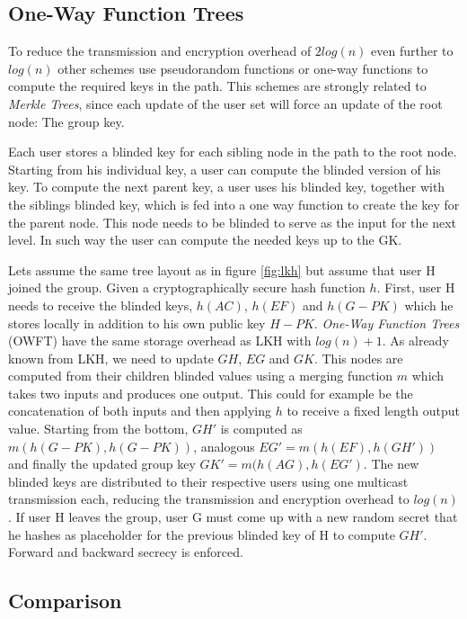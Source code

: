 \subsection{One-Way Function Trees}
To reduce the transmission and encryption overhead of $2log(n)$ even further to $log(n)$ other schemes use pseudorandom functions \cite{canetti1999multicast} or one-way functions \cite{sherman2003key} to compute the required keys in the path. This schemes are strongly related to \textit{Merkle Trees}, since each update of the user set will force an update of the root node: The group key.

Each user stores a blinded key for each sibling node in the path to the root node. Starting from his individual key, a user can compute the blinded version of his key. To compute the next parent key, a user uses his blinded key, together with the siblings blinded key, which is fed into a one way function to create the key for the parent node. This node needs to be blinded to serve as the input for the next level. In such way the user can compute the needed keys up to the GK. 

Lets assume the same tree layout as in figure \ref{fig:lkh} but assume that user H joined the group. Given a cryptographically secure hash function $h$. First, user H needs to receive the blinded keys, $h(AC)$, $h(EF)$ and $h(G-PK)$ which he stores locally in addition to his own public key $H-PK$. \textit{One-Way Function Trees} (\ac{OWFT}) have the same storage overhead as LKH with $log(n) + 1$.  As already known from LKH, we need to update $GH$, $EG$ and $GK$. This nodes are computed from their children blinded values using a merging function $m$ which takes two inputs and produces one output. This could for example be the concatenation of both inputs and then applying $h$ to receive a fixed length output value. Starting from the bottom,  $GH'$ is computed as $m(h(G-PK), h(G-PK))$, analogous $EG' = m(h(EF), h(GH'))$ and finally the updated group key $GK' = m(h(AG), h(EG')$. The new blinded keys are distributed to their respective users using one multicast transmission each, reducing the transmission and encryption overhead to $log(n)$. If user H leaves the group, user G must come up with a new random secret that he hashes as placeholder for the previous blinded key of H to compute $GH'$. Forward and backward secrecy is enforced.


\subsection{Comparison}  

